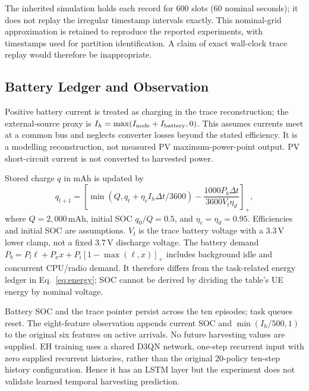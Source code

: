 \documentclass[conference]{IEEEtran}
\begin{document}
The inherited simulation holds each record for 600 slots (60 nominal seconds); it does not replay the irregular timestamp intervals exactly. This nominal-grid approximation is retained to reproduce the reported experiments, with timestamps used for partition identification. A claim of exact wall-clock trace replay would therefore be inappropriate.

\subsection{Battery Ledger and Observation}
Positive battery current is treated as charging in the trace reconstruction; the external-source proxy is $I_h=\max(I_{\rm node}+I_{\rm battery},0)$. This assumes currents meet at a common bus and neglects converter losses beyond the stated efficiency. It is a modelling reconstruction, not measured PV maximum-power-point output. PV short-circuit current is not converted to harvested power.

Stored charge $q$ in mAh is updated by
\begin{equation}
q_{t+1}=\left[\min(Q,q_t+\eta_c I_h\Delta t/3600)-\frac{1000P_b\Delta t}{3600V_t\eta_d}\right]_+,
\label{eq:battery}
\end{equation}
where $Q=2,000$\,mAh, initial SOC $q_0/Q=0.5$, and $\eta_c=\eta_d=0.95$. Efficiencies and initial SOC are assumptions. $V_t$ is the trace battery voltage with a 3.3\,V lower clamp, not a fixed 3.7\,V discharge voltage. The battery demand $P_b=P_l\ell+P_xx+P_i[1-\max(\ell,x)]_+$ includes background idle and concurrent CPU/radio demand. It therefore differs from the task-related energy ledger in Eq.~\eqref{eq:energy}; SOC cannot be derived by dividing the table's UE energy by nominal voltage.

Battery SOC and the trace pointer persist across the ten episodes; task queues reset. The eight-feature observation appends current SOC and $\min(I_h/500,1)$ to the original six features on active arrivals. No future harvesting values are supplied. EH training uses a shared D3QN network, one-step recurrent input with zero supplied recurrent histories, rather than the original 20-policy ten-step history configuration. Hence it has an LSTM layer but the experiment does not validate learned temporal harvesting prediction.
\end{document}
